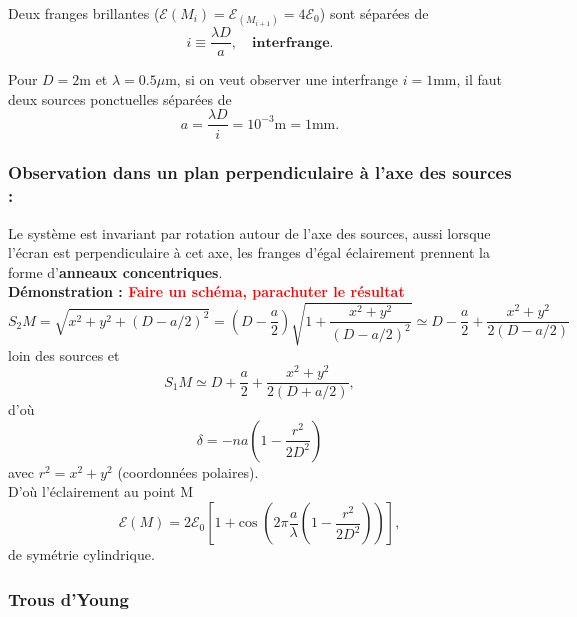\documentclass[11pt,a4paper]{report}
\begin{document}
Deux franges brillantes ($\mathcal{E}(M_i) = \mathcal{E}_(M_{i+1}) = 4\mathcal{E}_0$) sont séparées de
\begin{equation}
	\boxed{i \equiv \frac{\lambda D}{a}}, \quad\textbf{interfrange}.
\end{equation}

Pour $D = 2$m et $\lambda = 0.5 \mu$m, si on veut observer une interfrange $i = 1$mm, il faut deux sources ponctuelles séparées de
\begin{equation}
	a = \frac{\lambda D}{i} = 10^{-3}\text{m} = 1 \text{mm}.
\end{equation}

\subsubsection{Observation dans un plan perpendiculaire à l'axe des sources :}

Le système est invariant par rotation autour de l'axe des sources, aussi lorsque l'écran est perpendiculaire à cet axe, les franges d'égal éclairement prennent la forme d'\textbf{anneaux concentriques}.\\

\textbf{Démonstration : \textcolor{red}{Faire un schéma, parachuter le résultat}}\\
\begin{equation}
	S_2M = \sqrt{x^2 + y^2 + \left(D-a/2\right)^2} = \left(D-\frac{a}{2}\right)\sqrt{1 + \frac{x^2+y^2}{\left(D-a/2\right)^2}} \simeq D-\frac{a}{2} + \frac{x^2+y^2}{2\left(D - a/2\right)}
\end{equation}
loin des sources et
\begin{equation}
	S_1M \simeq D + \frac{a}{2} + \frac{x^2+y^2}{2\left(D + a/2\right)},
\end{equation}
d'où
\begin{equation}
	\boxed{\delta = -na\left(1-\frac{r^2}{2D^2}\right)}
\end{equation}
avec $r^2 = x^2 + y^2$ (coordonnées polaires).\\

D'où l'éclairement au point M
\begin{equation}
	\boxed{\mathcal{E}(M) = 2\mathcal{E}_0 \left[1 
	+ \text{cos}\;\left(2\pi\frac{a}{\lambda}\left(1 - \frac{r^2}{2D^2} \right)\right)\right]},
\end{equation}
de symétrie cylindrique.

\subsubsection{Trous d'Young}
\end{document}
